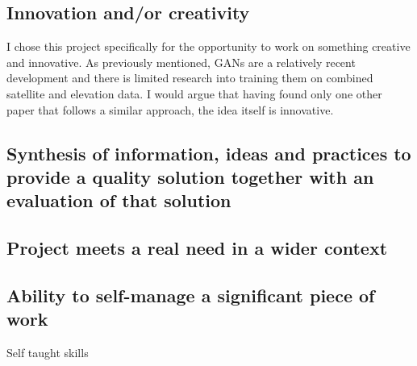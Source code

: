\documentclass[a4paper]{report}
\begin{document}
\subsection{Innovation and/or creativity}
I chose this project specifically for the opportunity to work on something creative and innovative. As previously mentioned, GANs are a relatively recent development and there is limited research into training them on combined satellite and elevation data. I would argue that having found only one other paper that follows a similar approach, the idea itself is innovative. 
\subsection{Synthesis of information, ideas and practices to provide a quality solution together with an evaluation of that solution}
\subsection{Project meets a real need in a wider context}
\subsection{Ability to self-manage a significant piece of work}
Self taught skills
\end{document}
